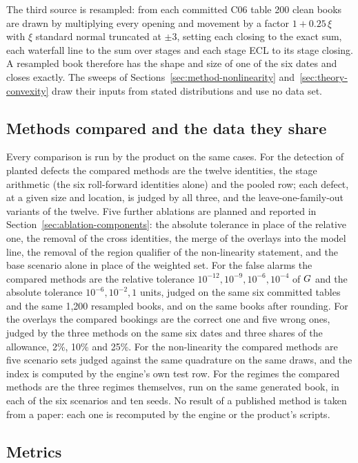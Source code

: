 The third source is resampled: from each committed C06 table 200 clean books are drawn by multiplying every opening and movement by a factor $1+0.25\,\xi$ with $\xi$ standard normal truncated at $\pm3$, setting each closing to the exact sum, each waterfall line to the sum over stages and each stage ECL to its stage closing.
A resampled book therefore has the shape and size of one of the six dates and closes exactly.
The sweeps of Sections~\ref{sec:method-nonlinearity} and~\ref{sec:theory-convexity} draw their inputs from stated distributions and use no data set.

\subsection{Methods compared and the data they share}
\label{sec:design-comparators}

Every comparison is run by the product on the same cases.
For the detection of planted defects the compared methods are the twelve identities, the stage arithmetic (the six roll-forward identities alone) and the pooled row; each defect, at a given size and location, is judged by all three, and the leave-one-family-out variants of the twelve.
Five further ablations are planned and reported in Section~\ref{sec:ablation-components}: the absolute tolerance in place of the relative one, the removal of the cross identities, the merge of the overlays into the model line, the removal of the region qualifier of the non-linearity statement, and the base scenario alone in place of the weighted set.
For the false alarms the compared methods are the relative tolerance $10^{-12},10^{-9},10^{-6},10^{-4}$ of $G$ and the absolute tolerance $10^{-6},10^{-2},1$ units, judged on the same six committed tables and the same 1,200 resampled books, and on the same books after rounding.
For the overlays the compared bookings are the correct one and five wrong ones, judged by the three methods on the same six dates and three shares of the allowance, 2\%, 10\% and 25\%.
For the non-linearity the compared methods are five scenario sets judged against the same quadrature on the same \efourDesignDraws{} draws, and the index is computed by the engine's own test row.
For the regimes the compared methods are the three regimes themselves, run on the same generated book, in each of the six scenarios and ten seeds.
No result of a published method is taken from a paper: each one is recomputed by the engine or the product's scripts.

\subsection{Metrics}
\label{sec:design-metrics}

